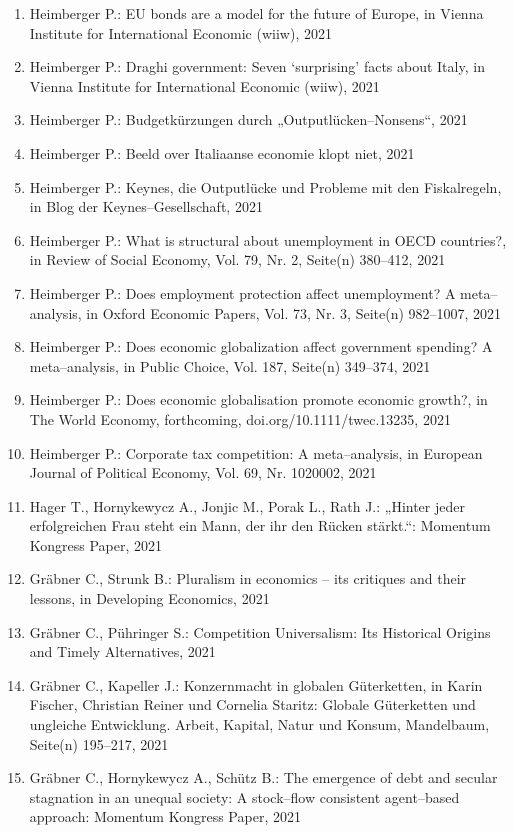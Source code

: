 \begin{enumerate}
	 \item Heimberger P.: EU bonds are a model for the future of Europe, in Vienna Institute for International Economic (wiiw), 2021
	 \item Heimberger P.: Draghi government: Seven ‘surprising’ facts about Italy, in Vienna Institute for International Economic (wiiw), 2021
	 \item Heimberger P.: Budgetkürzungen durch „Outputlücken--Nonsens“, 2021
	 \item Heimberger P.: Beeld over Italiaanse economie klopt niet, 2021
	 \item Heimberger P.: Keynes, die Outputlücke und Probleme mit den Fiskalregeln, in Blog der Keynes--Gesellschaft, 2021
	 \item Heimberger P.: What is structural about unemployment in OECD countries?, in Review of Social Economy, Vol. 79, Nr. 2, Seite(n) 380--412, 2021
	 \item Heimberger P.: Does employment protection affect unemployment? A meta--analysis, in Oxford Economic Papers, Vol. 73, Nr. 3, Seite(n) 982--1007, 2021
	 \item Heimberger P.: Does economic globalization affect government spending? A meta--analysis, in Public Choice, Vol. 187, Seite(n) 349--374, 2021
	 \item Heimberger P.: Does economic globalisation promote economic growth?, in The World Economy, forthcoming, doi.org/10.1111/twec.13235, 2021
	 \item Heimberger P.: Corporate tax competition: A meta--analysis, in European Journal of Political Economy, Vol. 69, Nr. 1020002, 2021
	 \item Hager T., Hornykewycz A., Jonjic M., Porak L., Rath J.: „Hinter jeder erfolgreichen Frau steht ein Mann, der ihr den Rücken stärkt.“: Momentum Kongress Paper, 2021
	 \item Gräbner C., Strunk B.: Pluralism in economics – its critiques and their lessons, in Developing Economics, 2021
	 \item Gräbner C., Pühringer S.: Competition Universalism: Its Historical Origins and Timely Alternatives, 2021
	 \item Gräbner C., Kapeller J.: Konzernmacht in globalen Güterketten, in Karin Fischer, Christian Reiner und Cornelia Staritz: Globale Güterketten und ungleiche Entwicklung. Arbeit, Kapital, Natur und Konsum, Mandelbaum, Seite(n) 195--217, 2021
	 \item Gräbner C., Hornykewycz A., Schütz B.: The emergence of debt and secular stagnation in an unequal society: A stock--flow consistent agent--based approach: Momentum Kongress Paper, 2021

\end{enumerate}
